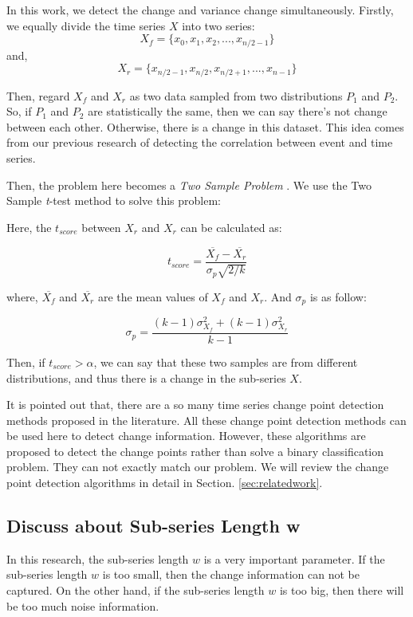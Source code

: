 In this work, we detect the change and variance change simultaneously.
Firstly, we equally divide the time series $X$ into two series: 
\[X_{f} = \{x_0,x_1,x_2,...,x_{n/2-1}\}\]
and, 
\[X_{r} = \{x_{n/2-1},x_{n/2},x_{n/2+1},...,x_{n-1}\}\]

Then, regard $X_{f}$ and $X_{r}$ as two data sampled from two distributions $P_1$ and $P_2$. So, if $P_1$ and $P_2$ are statistically the same, then we can say there's not change between each other. Otherwise, there is a change in this dataset. This idea comes from our previous research of detecting the correlation between event and time series.

Then, the problem here becomes a \textit{Two Sample Problem} \cite{gretton2006kernel}. We use the Two Sample \textit{t}-test \cite{moore2007basic} method to solve this problem:

Here, the $t_{score}$ between $X_{r}$ and $X_{r}$ can be calculated as:

\begin{equation}
t_{score} = \frac{\overline{X_{f}} - \overline{X_{r}}}{\sigma_p\sqrt{2/k}}
\end{equation}

where, $\overline{X_{f}}$ and $\overline{X_{r}}$ are the mean values of $X_{f}$ and $X_{r}$. And $\sigma_p$ is as follow:

\begin{equation}
\sigma_p = \frac{(k-1)\sigma_{X_{f}}^2 + (k-1)\sigma_{X_{r}}^2}{k-1}
\end{equation}

Then, if $t_{score} > \alpha$, we can say that these two samples are from different distributions, and thus there is a change in the sub-series $X$.

It is pointed out that, there are a so many time series change point detection methods \cite{liu2013change,chen2013contextual} proposed in the literature. 
All these change point detection methods can be used here to detect change information.
However, these algorithms are proposed to detect the change points rather than solve a binary classification problem. They can not exactly match our problem. We will review the change point detection algorithms in detail in Section. \ref{sec:relatedwork}.

\subsection{Discuss about Sub-series Length w}

In this research, the sub-series length $w$ is a very important parameter.
If the sub-series length $w$ is too small, then the change information can not be captured. 
On the other hand, if the sub-series length $w$ is too big, then there will be too much noise information.

